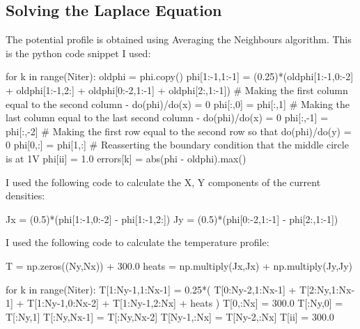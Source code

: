\documentclass[12pt, a4paper]{article}
\begin{document}
\subsection{Solving the Laplace Equation}
The potential profile is obtained using Averaging the Neighbours algorithm. This is the python code snippet I used:
\begin{py_code}
for k in range(Niter):
    oldphi = phi.copy()
    phi[1:-1,1:-1] = (0.25)*(oldphi[1:-1,0:-2] + oldphi[1:-1,2:] + oldphi[0:-2,1:-1] + oldphi[2:,1:-1])
    # Making the first column equal to the second column - do(phi)/do(x) = 0
    phi[:,0] = phi[:,1]
    # Making the last column equal to the last second column - do(phi)/do(x) = 0
    phi[:,-1] = phi[:,-2]
    # Making the first row equal to the second row so that do(phi)/do(y) = 0           
    phi[0,:] = phi[1,:]      
    # Reasserting the boundary condition that the middle circle is at 1V       
    phi[ii] = 1.0                   
    errors[k] = abs(phi - oldphi).max()
\end{py_code}
I used the following code to calculate the X, Y components of the current densities:
\begin{py_code}
    Jx = (0.5)*(phi[1:-1,0:-2] - phi[1:-1,2:])
    Jy = (0.5)*(phi[0:-2,1:-1] - phi[2:,1:-1])
\end{py_code}
\vspace{0.7cm}
I used the following code to calculate the temperature profile:
\begin{py_code}
    T = np.zeros((Ny,Nx)) + 300.0
    heats = np.multiply(Jx,Jx) + np.multiply(Jy,Jy)

    for k in range(Niter):
        T[1:Ny-1,1:Nx-1] = 0.25*( T[0:Ny-2,1:Nx-1] + T[2:Ny,1:Nx-1] + T[1:Ny-1,0:Nx-2] + T[1:Ny-1,2:Nx] + heats )
        T[0,:Nx] = 300.0
        T[:Ny,0] = T[:Ny,1]
        T[:Ny,Nx-1] = T[:Ny,Nx-2]
        T[Ny-1,:Nx] = T[Ny-2,:Nx]
        T[ii] = 300.0   
\end{py_code}
\end{document}
